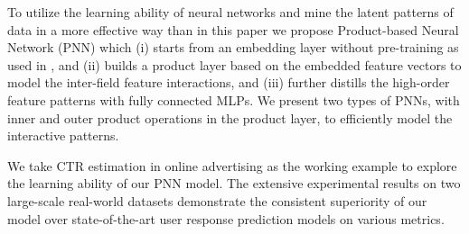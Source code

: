 \documentclass[conference]{IEEEtran}
\newcommand{\rocky}[1]{{\bf \color{pink} [[Rocky says ``#1'']]}}
\begin{document}


To utilize the learning ability of neural networks and mine the latent patterns of data in a more effective way than  in this paper we propose Product-based Neural Network (PNN) which (i) starts from an embedding layer without pre-training as used in \cite{zhang2016deep}, and (ii) builds a product layer based on the embedded feature vectors to model the inter-field feature interactions, and (iii) further distills the high-order feature patterns with fully connected MLPs.
We present two types of PNNs, with inner and outer product operations in the product layer, to efficiently model the interactive patterns.

We take CTR estimation in online advertising as the working example to explore the learning ability of our PNN model. The extensive experimental results on two large-scale real-world datasets demonstrate the consistent superiority of our model over state-of-the-art user response prediction models \cite{ta2015factorization,liu2015convolutional,zhang2016deep} on various metrics.


\end{document}
